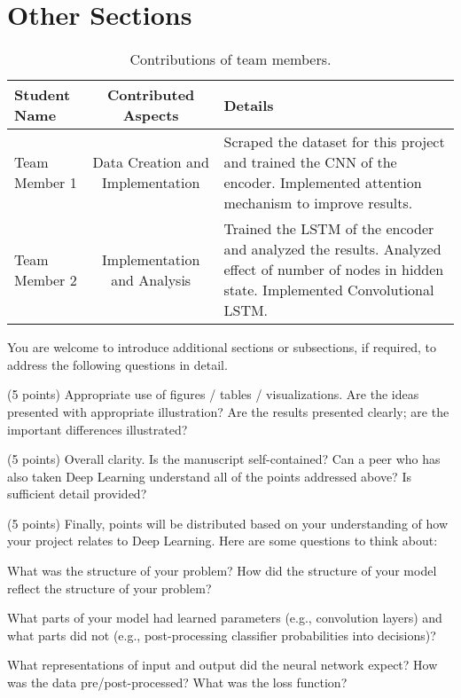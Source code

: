 \documentclass[10pt,twocolumn,letterpaper]{article}
\begin{document}
\section{Other Sections}

\begin{table*}
\begin{center}
\begin{tabular}{|l|c|p{8cm}|}
\hline
Student Name & Contributed Aspects & Details \\
\hline\hline
Team Member 1 & Data Creation and Implementation & Scraped the dataset for this project and trained the CNN of the encoder. Implemented attention mechanism to improve results. \\
Team Member 2 & Implementation and Analysis & Trained the LSTM of the encoder and analyzed the results. Analyzed effect of number of nodes in hidden state.  Implemented Convolutional LSTM. \\
\hline
\end{tabular}
\end{center}
\caption{Contributions of team members.}
\label{tab:contributions}
\end{table*}



You are welcome to introduce additional sections or subsections, if required, to address the following questions in detail. 

(5 points) Appropriate use of figures / tables / visualizations. Are the ideas presented with appropriate illustration? Are the results presented clearly; are the important differences illustrated? 

(5 points) Overall clarity. Is the manuscript self-contained? Can a peer who has also taken Deep Learning understand all of the points addressed above? Is sufficient detail provided? 

(5 points) Finally, points will be distributed based on your understanding of how your project relates to Deep Learning. Here are some questions to think about: 

What was the structure of your problem? How did the structure of your model reflect the structure of your problem? 

What parts of your model had learned parameters (e.g., convolution layers) and what parts did not (e.g., post-processing classifier probabilities into decisions)? 

What representations of input and output did the neural network expect? How was the data pre/post-processed?
What was the loss function? 
\end{document}
